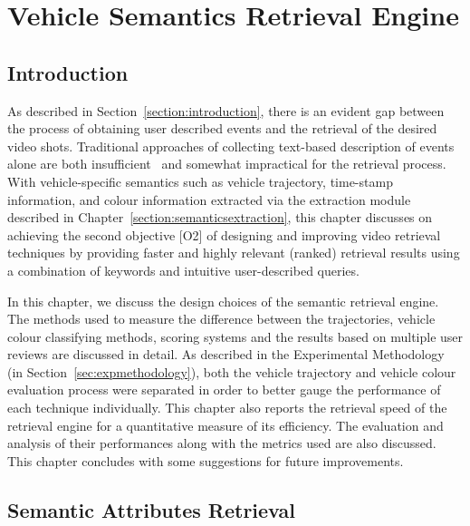 
\chapter{Vehicle Semantics Retrieval Engine}

\label{section:retrievalengine}
\section{Introduction}

As described in Section~\ref{section:introduction}, there is an evident gap between the process of obtaining user described events and the retrieval of the desired video shots. Traditional approaches of collecting text-based description of events alone are both insufficient~\cite{bhaumik2016hybrid} and somewhat impractical for the retrieval process.
With vehicle-specific semantics such as vehicle trajectory, time-stamp information, and colour information extracted via the extraction module described in Chapter~\ref{section:semanticsextraction}, this chapter discusses on achieving the second objective [O2] of designing and improving video retrieval techniques by providing faster and highly relevant (ranked) retrieval results using a combination of keywords and intuitive user-described queries.

In this chapter, we discuss the design choices of the semantic retrieval engine. 
The methods used to measure the difference between the
trajectories, vehicle colour classifying methods, scoring systems and the results based on multiple user reviews are discussed in detail.
As described in the Experimental Methodology (in Section~\ref{sec:expmethodology}),
both the vehicle trajectory and vehicle colour evaluation process were separated in order to better gauge the performance of each technique individually.
This chapter also reports the retrieval speed of the retrieval engine for a quantitative measure of its efficiency.
The evaluation and analysis of their performances along with the metrics used are also discussed. This chapter concludes with some
suggestions for future improvements.


\section{Semantic Attributes Retrieval}
\label{sec:semanticattributeretrieval}

